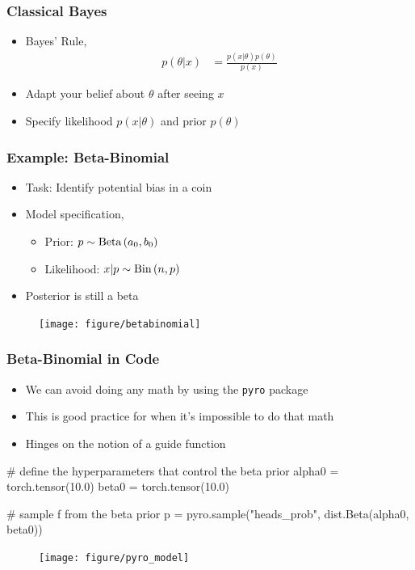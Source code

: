 \documentclass[10pt,mathserif]{beamer}
\begin{document}
\begin{frame}
  \frametitle{Classical Bayes}
  \begin{itemize}
  \item Bayes' Rule,
    \begin{align*}
      p\left(\theta \vert x\right) &= \frac{p\left(x \vert \theta\right)p\left(\theta\right)}{p\left(x\right)}
    \end{align*}
  \item Adapt your belief about $\theta$ after seeing $x$
  \item Specify likelihood $p\left(x \vert \theta\right)$ and prior $p\left(\theta\right)$
  \end{itemize} 
\end{frame}

\begin{frame}
  \frametitle{Example: Beta-Binomial}
  \begin{itemize}
  \item Task: Identify potential bias in a coin
  \item Model specification,
    \begin{itemize}
    \item Prior: $p \sim \textnormal{Beta}\left(a_0, b_0\right)$
    \item Likelihood: $x \vert p \sim \textnormal{Bin}\left(n, p\right)$
    \end{itemize}
  \item Posterior is still a beta
  \end{itemize} 
\begin{figure}[ht]
  \centering
  \texttt{[image: figure/betabinomial]}
  \caption{\label{fig:betabinomial} }
\end{figure}
\end{frame}

\begin{frame}
  \frametitle{Beta-Binomial in Code}
  \begin{itemize}
  \item We can avoid doing any math by using the \texttt{pyro} package
  \item This is good practice for when it's impossible to do that math
  \item Hinges on the notion of a guide function
  \end{itemize} 
  \begin{python}
    # define the hyperparameters that control the beta prior
    alpha0 = torch.tensor(10.0)
    beta0 = torch.tensor(10.0)

    # sample f from the beta prior
    p = pyro.sample("heads_prob", dist.Beta(alpha0, beta0))
  \end{python}
  \begin{figure}[ht]
    \centering
    \texttt{[image: figure/pyro\_model]}
    \caption{\label{fig:pyro_model} }
  \end{figure}
\end{frame}
\end{document}
